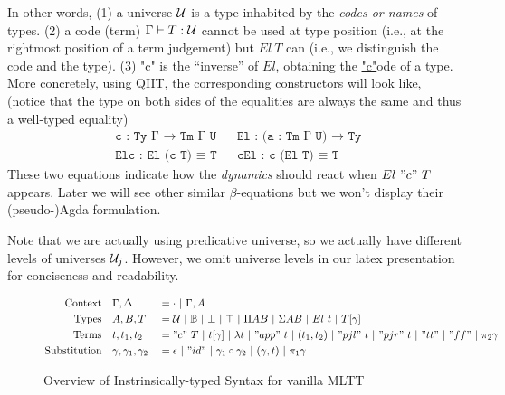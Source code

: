 In other words, (1) a universe ${\mathcal{U}}$ is a type inhabited by the \textit{codes or names} of types.
(2) a code (term) ${ {\Gamma} \vdash {T} : {{\mathcal{U}}} }$ cannot be used at type position
(i.e., at the rightmost position of a term judgement) but $El \ T$ can (i.e., we distinguish the code and the type).
(3) "c" is the ``inverse'' of $El$, obtaining  the \underline{"c"}ode of
a type. More concretely, using QIIT, the corresponding constructors will
look like, (notice that the type on both sides of the equalities are
always the same and thus a well-typed equality) 
\begin{align*}
  &\texttt{c : Ty Γ → Tm Γ U} &&\texttt{El : (a : Tm Γ U) → Ty } \\
  &\texttt{Elc : El (c T) ≡ T} && \texttt{cEl : c (El T) ≡ T}
\end{align*}
These two equations indicate how the \textit{dynamics} should react when
$El~"c"~T$ appears. Later we will see other similar $\beta$-equations
but we won't display their (pseudo-)Agda formulation.

Note that we are actually using predicative universe, so we actually
have different levels of universes ${\mathcal{U}}_j$. However, we omit universe levels in our latex presentation for conciseness and readability.

\begin{figure}[!htb]
  \begin{alignat*}{3}
    \text{Context} \quad & \Gamma, \Delta &&= \cdot~|~ \Gamma, A \\ 
    \text{Types}   \quad & A, B, T        &&= {\mathcal{U}}~|~{\mathbb{B}}~|~\bot~|~\top~|~\Pi A B~|~\Sigma A B~|~El~t~|~T[\gamma]\\
    \text{Terms}   \quad & t, t_1, t_2    &&= "c"~T~|~t[\gamma]~|~\lambda t~|~"app"~t~|~(t_1,t_2)~|~"pjl"~t~|~"pjr"~t~|~"tt"~|~"ff"~|~\pi_2 \gamma  \\
    \text{Substitution}   \quad & \gamma, \gamma_1, \gamma_2    &&= \epsilon~|~"id"~|~\gamma_1 \circ \gamma_2~|~(\gamma, t)~|~\pi_1 \gamma \\
  \end{alignat*}
\caption[Caption for LOF]{Overview of Instrinsically-typed Syntax for vanilla MLTT\protect\footnotemark}
\end{figure}

